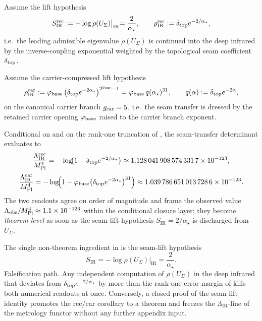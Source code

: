 \begin{conjecture}
\label{conj:ir-seam-rec-continuation}
Assume the lift hypothesis
\[
S_{\mathrm{IR}}^{\mathrm{rec}}
:=
-\log\rho(U_\Sigma)\bigl|_{\mathrm{IR}}
=
\frac{2}{\alpha_\star},
\qquad
\rho_{\mathrm{IR}}^{\mathrm{rec}}
:=
\delta_{\mathrm{top}} e^{-2/\alpha_\star},
\]
i.e.\ the leading admissible eigenvalue $\rho(U_\Sigma)$ is continued into the deep infrared by the
inverse-coupling exponential weighted by the topological seam coefficient $\delta_{\mathrm{top}}$.
\end{conjecture}

\begin{conjecture}
\label{conj:ir-seam-car-continuation}
Assume the carrier-compressed lift hypothesis
\[
\rho_{\mathrm{IR}}^{\mathrm{car}}
:=
\varphi_{\mathrm{base}}\,\bigl(\delta_{\mathrm{top}} e^{-2\alpha_\star}\bigr)^{2^{g_{\mathrm{car}}}-1}
=
\varphi_{\mathrm{base}}\,q(\alpha_\star)^{31},
\qquad
q(\alpha):=\delta_{\mathrm{top}} e^{-2\alpha},
\]
on the canonical carrier branch $g_{\mathrm{car}}=5$, i.e.\ the seam transfer is dressed by the retained
carrier opening $\varphi_{\mathrm{base}}$ raised to the carrier branch exponent.
\end{conjecture}

\begin{corollary}
\label{cor:conditional-lambda-ir-readout}
Conditional on  and on the
rank-one truncation of , the seam-transfer determinant evaluates
to
\[
\frac{\Lambda_{\mathrm{IR}}^{\mathrm{rec}}}{M_{\mathrm{Pl}}^4}
=
-\log\!\bigl(1-\delta_{\mathrm{top}} e^{-2/\alpha_\star}\bigr)
\approx
\num{1.1280419085743317e-123},
\]
\[
\frac{\Lambda_{\mathrm{IR}}^{\mathrm{car}}}{M_{\mathrm{Pl}}^4}
=
-\log\!\Bigl(1-\varphi_{\mathrm{base}}\bigl(\delta_{\mathrm{top}} e^{-2\alpha_\star}\bigr)^{31}\Bigr)
\approx
\num{1.0397866510137286e-123}.
\]
The two readouts agree on order of magnitude and frame the observed value
$\Lambda_{\mathrm{obs}}/M_{\mathrm{Pl}}^4\approx\num{1.1e-123}$ within the conditional closure layer; they
become \emph{theorem level} as soon as the seam-lift hypothesis $S_{\mathrm{IR}}=2/\alpha_\star$ is
discharged from $U_\Sigma$.
\end{corollary}

\begin{remark}
The single non-theorem ingredient in  is the seam-lift
hypothesis
\[
S_{\mathrm{IR}}=-\log\rho(U_\Sigma)\bigl|_{\mathrm{IR}}=\frac{2}{\alpha_\star}.
\]
Falsification path. Any independent computation of $\rho(U_\Sigma)$ in the deep infrared that
deviates from $\delta_{\mathrm{top}} e^{-2/\alpha_\star}$ by more than the rank-one error margin of
 kills both numerical readouts at once. Conversely, a closed
proof of the seam-lift identity promotes the rec/car corollary to a theorem and freezes the
\(\Lambda_{\mathrm{IR}}\)-line of the metrology functor without any further appendix input.
\end{remark}


